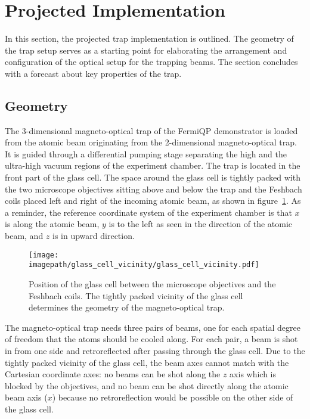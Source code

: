 \section{Projected Implementation}
In this section, the projected trap implementation is outlined. The geometry of the trap setup serves as a starting point for elaborating the arrangement and configuration of the optical setup for the trapping beams. The section concludes with a forecast about key properties of the trap.

\subsection*{Geometry}
The 3-dimensional magneto-optical trap of the FermiQP demonstrator is loaded from the atomic beam originating from the 2-dimensional magneto-optical trap. It is guided through a differential pumping stage separating the high and the ultra-high vacuum regions of the experiment chamber. The trap is located in the front part of the glass cell. The space around the glass cell is tightly packed with the two microscope objectives sitting above and below the trap and the Feshbach coils placed left and right of the incoming atomic beam, as shown in figure~\ref{fig:glass_cell_vicinity}. As a reminder, the reference coordinate system of the experiment chamber is that $x$ is along the atomic beam, $y$ is to the left as seen in the direction of the atomic beam, and $z$ is in upward direction.

\begin{figure}
    \centering
    \texttt{[image: \\imagepath/glass\_cell\_vicinity/glass\_cell\_vicinity.pdf]}
    \caption{Position of the glass cell between the microscope objectives and the Feshbach coils. The tightly packed vicinity of the glass cell determines the geometry of the magneto-optical trap.}\label{fig:glass_cell_vicinity}
\end{figure}

The magneto-optical trap needs three pairs of beams, one for each spatial degree of freedom that the atoms should be cooled along. For each pair, a beam is shot in from one side and retroreflected after passing through the glass cell. Due to the tightly packed vicinity of the glass cell, the beam axes cannot match with the Cartesian coordinate axes: no beams can be shot along the $z$ axis which is blocked by the objectives, and no beam can be shot directly along the atomic beam axis ($x$) because no retroreflection would be possible on the other side of the glass cell.

